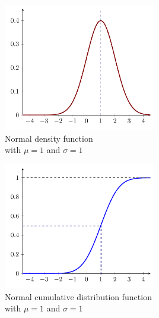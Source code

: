 \documentclass[a4paper]{article}
\begin{document}
		\begin{multicols}{2}
		\centering
		\includegraphics[width=0.5\textwidth]{normal_1-1_density}\\
		Normal density function\\ with $\mu=1$ and $\sigma=1$
		\columnbreak
		
		\includegraphics[width=0.5\textwidth]{normal_1-1_CDF}\\
		Normal cumulative distribution function\\ with $\mu=1$ and $\sigma=1$
		\end{multicols}
		
\end{document}
